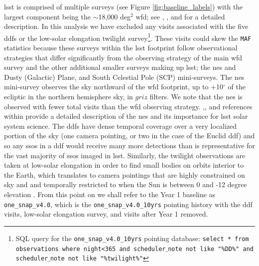 \documentclass[preprintm,linenumbers]{aastex631}
\newcommand{\baseline}{\texttt{one\_snap\_v4.0}\xspace}
\newcommand{\baselinefull}{\texttt{one\_snap\_v4.0\_10yrs}\xspace}
\newcommand{\maf}{\texttt{MAF}\xspace}
\begin{document}
	\gls*{lsst} is comprised of multiple surveys (see Figure \ref{fig:baseline_labels}) with the largest component being the $\sim$18,000 deg$^2$ \gls*{wfd}; see \cite{SCOC_Report_1}, \cite{2022ApJS..258....1B}, and \cite{SCOC_Report_2} for a detailed description. 
	In this analysis we have excluded any visits associated with the five \glspl*{ddf} or the low-solar elongation twilight survey\footnote{SQL query for the \baselinefull pointing database: \texttt{select * from observations where night<365 and scheduler$\_$note not like "\%DD\%" and scheduler$\_$note not like "\%twilight\%"}}.
	These visits could skew the \maf statistics because these surveys within the \gls*{lsst} footprint follow  observational strategies that differ significantly from the observing strategy of the main \gls*{wfd} survey and the other additional smaller surveys making up \gls*{lsst}; the \gls*{nes} and Dusty (Galactic) Plane, and South Celestial Pole (SCP) mini-surveys. 
 The \gls*{nes} mini-survey observes the sky northward of the \gls*{wfd} footprint, up to +10$^{\circ}$ of the ecliptic in the northern hemisphere sky, in $griz$ filters. We note that the \gls*{nes} is observed with fewer total visits than the \gls*{wfd} observing strategy. 
 \cite{2018arXiv181201149S},\cite{schwambTuningLegacySurvey2023}, and references within provide a detailed description of the \gls*{nes} and its importance for \gls*{lsst} solar system science. 
	The \glspl*{ddf} have dense temporal coverage over a very localized portion of the sky (one camera pointing, or two in the case of the Euclid \gls*{ddf}) and so any \glspl*{sso} in a \gls*{ddf} would receive many more detections than is representative for the vast majority of \glspl*{sso} imaged in \gls*{lsst}. Similarly, the twilight observations are taken at low-solar elongation in order to find small bodies on orbits interior to the Earth, which translates to camera pointings that are highly constrained on sky and and temporally restricted to when the Sun is between 0 and -12 degree elevation \citep{SCOC_Report_3}. 
	From this point on we shall refer to the Year 1 baseline as \baseline, which is the \baselinefull pointing history with the \gls*{ddf} visits,  low-solar elongation survey, and visits after Year 1 removed.
	
\end{document}
